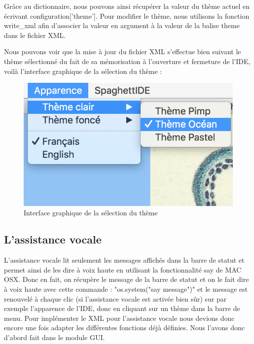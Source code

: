 \documentclass[a4paper,12pt]{article}
\begin{document}
Grâce au dictionnaire, nous pouvons ainsi récupérer la valeur du thème actuel en écrivant configuration['theme']. Pour modifier le thème, nous utilisons la fonction write\_xml afin d'associer la valeur en argument à la valeur de la balise theme dans le fichier XML. 

Nous pouvons voir que la mise à jour du fichier XML s'effectue bien suivant le thème sélectionné du fait de sa mémorisation à l'ouverture et fermeture de l'IDE, voilà l'interface graphique de la sélection du thème : 

\begin{figure}[h!]
			\begin{center}
				\includegraphics[scale=0.6]{images/themes_selection.png}
				\caption{Interface graphique de la sélection du thème}
			\end{center}
		\end{figure}

\subsection{L'assistance vocale}

L'assistance vocale lit seulement les messages affichés dans la barre de statut et permet ainsi de les dire à voix haute en utilisant la fonctionnalité say de MAC OSX. Donc en fait, on récupère le message de la barre de statut et on le fait dire à voix haute avec cette commande : "os.system("say message")" et le message est renouvelé à chaque clic (si l'assistance vocale est activée bien sûr) sur par exemple l'apparence de l'IDE, donc en cliquant sur un thème dans la barre de menu. Pour implémenter le XML pour l'assistance vocale nous devions donc encore une fois adapter les différentes fonctions déjà définies. Nous l'avons donc d'abord fait dans le module GUI. 
\end{document}
